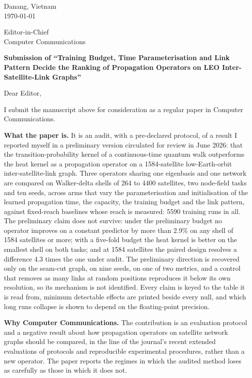 \documentclass[11pt,a4paper]{article}
\begin{document}
\begin{flushright}Danang, Vietnam\\ \today\end{flushright}

Editor-in-Chief\\
Computer Communications

\textbf{Submission of ``Training Budget, Time Parameterisation and Link Pattern Decide the Ranking of
Propagation Operators on LEO Inter-Satellite-Link Graphs''}

Dear Editor,

I submit the manuscript above for consideration as a regular paper in Computer Communications.

\textbf{What the paper is.} It is an audit, with a pre-declared protocol, of a result I reported
myself in a preliminary version circulated for review in June 2026: that the transition-probability
kernel of a continuous-time quantum walk outperforms the heat kernel as a propagation operator on a
1584-satellite low-Earth-orbit inter-satellite-link graph. Three operators sharing one eigenbasis and
one network are compared on Walker-delta shells of 264 to 4400 satellites, two node-field tasks and
ten seeds, across arms that vary the parameterisation and initialisation of the learned propagation
time, the capacity, the training budget and the link pattern, against fixed-reach baselines whose
reach is measured: 5590 training runs in all. The preliminary claim does not survive: under the
preliminary budget no operator improves on a constant predictor by more than 2.9\% on any shell of
1584 satellites or more; with a five-fold budget the heat kernel is better on the smallest shell on
both tasks; and at 1584 satellites the paired design resolves a difference 4.3 times the one under
audit. The preliminary direction is recovered only on the seam-cut graph, on nine seeds, on one of
two metrics, and a control that removes as many links at random positions reproduces it below its
own resolution, so its mechanism is not identified. Every claim is keyed to the table it is read
from, minimum detectable effects are printed beside every null, and which long runs collapse is
shown to depend on the floating-point precision.

\textbf{Why Computer Communications.} The contribution is an evaluation protocol and a negative
result about how propagation operators on satellite network graphs should be compared, in the line
of the journal's recent extended evaluations of protocols and reproducible experimental procedures,
rather than a new operator. The paper reports the regimes in which the audited method loses as
carefully as those in which it does not.
\end{document}
